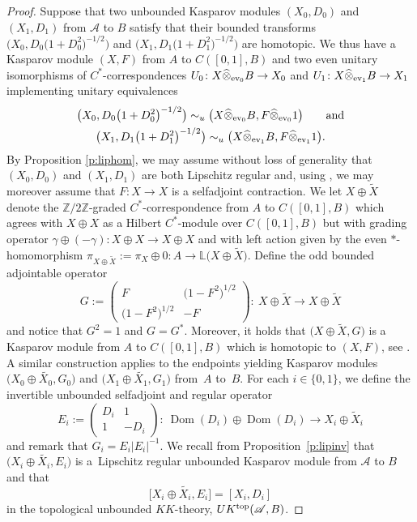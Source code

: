 \documentclass[pdftex]{sigma}
\numberwithin{equation}{section}
\newcommand{\hot}{\widehat \otimes}
\newcommand{\op}{\oplus}
\newcommand{\zz}{\mathbb{Z}}
\newcommand{\ga}{\gamma}
\newcommand{\s}[1]{\mathscr{#1}}
\newcommand{\B}[1]{\mathbb{#1}}
\newcommand{\wit}{\widetilde}
\begin{document}
\begin{proof}
Suppose that two unbounded Kasparov modules $(X_0,D_0)$ and $(X_1,D_1)$ from $\s A$ to $B$ satisfy that their bounded transforms $\big(X_0, D_0\big(1 + D_0^2\big)^{-1/2}\big)$ and $\big(X_1,D_1\big(1 + D_1^2\big)^{-1/2}\big)$ are homotopic. We thus have a Kasparov module $(X,F)$ from $A$ to $C([0,1],B)$ and two even unitary isomorphisms of $C^*$-correspondences $U_0\colon X \hot_{{\rm ev}_0} B \to X_0$ and $U_1\colon X \hot_{{\rm ev}_1} B \to X_1$ implementing unitary equivalences
\begin{gather*}
 \big(X_0, D_0 \big(1 + D_0^2\big)^{-1/2}\big) \sim_u \big(X \hot_{{\rm ev}_0} B, F \hot_{{\rm ev}_0} 1\big) \qquad \text{and} \\
 \big(X_1, D_1 \big(1 + D_1^2\big)^{-1/2}\big) \sim_u \big(X \hot_{{\rm ev}_1} B, F \hot_{{\rm ev}_1} 1\big) .
\end{gather*}
By Proposition \ref{p:liphom}, we may assume without loss of generality that $(X_0,D_0)$ and $(X_1,D_1)$ are both Lipschitz regular and, using \cite[Proposition~17.4.3]{Bla:KOA}, we may moreover assume that \mbox{$F\colon X \to X$} is a selfadjoint contraction. We let $X \op \wit X$ denote the $\zz/2\zz$-graded $C^*$-cor\-respon\-dence from $A$ to $C( [0,1],B)$ which agrees with $X \op X$ as a Hilbert $C^*$-module over $C([0,1],B)$ but with grading operator $\ga \op (-\ga)\colon X \op X \to X \op X$ and with left action given by the even $*$-homomorphism $\pi_{X \op \wit X} := \pi_X \op 0\colon A \to \B L\big(X \op \wit X\big)$. Define the odd bounded adjointable operator
\[
G := \left(\begin{matrix} F & \big(1 - F^2\big)^{1/2} \\ \big(1 - F^2\big)^{1/2} & - F\end{matrix}\right) \colon \ X \op \wit X \to X \op \wit X
\]
and notice that $G^2 = 1$ and $G = G^*$. Moreover, it holds that $\big(X \op \wit X, G\big)$ is a Kasparov module from $A$ to $C( [0,1],B)$ which is homotopic to $(X,F)$, see \cite[Section~17.6]{Bla:KOA}. A similar construction applies to the endpoints yielding Kasparov modules $\big(X_0 \op \wit{X_0}, G_0\big)$ and $\big(X_1 \op \wit{X_1}, G_1\big)$ from~$A$ to~$B$. For each $i \in \{0,1\}$, we define the invertible unbounded selfadjoint and regular operator
\[
E_i := \left(\begin{matrix} D_i & 1 \\ 1 & - D_i\end{matrix}\right) \colon \ \operatorname{Dom}(D_i) \op \operatorname{Dom}(D_i) \to X_i \op \wit X_i
\]
and remark that $G_i = E_i |E_i|^{-1}$. We recall from Proposition~\ref{p:lipinv} that $\big(X_i \op \wit{X_i}, E_i\big)$ is a~Lipschitz regular unbounded Kasparov module from $\s A$ to $B$ and that{\samepage
\[
\big[ X_i \op \wit{X_i}, E_i\big] = [X_i , D_i]
\]
in the topological unbounded $KK$-theory, $UK^{{\rm top}}(\s A,B)$.}


\end{proof}
\end{document}
